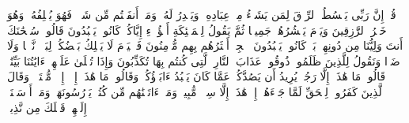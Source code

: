 \startbuffer[\q:34:39]
قُلۡ إِنَّ رَبِّی یَبۡسُطُ ٱلرِّزۡقَ لِمَن یَشَاۤءُ مِنۡ عِبَادِهِۦ وَیَقۡدِرُ لَهُۥۚ وَمَاۤ أَنفَقۡتُم مِّن شَیۡءࣲ فَهُوَ یُخۡلِفُهُۥۖ وَهُوَ خَیۡرُ ٱلرَّٰزِقِینَ%
\stopbuffer
\startbuffer[\q:34:40]
وَیَوۡمَ یَحۡشُرُهُمۡ جَمِیعࣰا ثُمَّ یَقُولُ لِلۡمَلَٰۤئِكَةِ أَهَٰۤؤُلَاۤءِ إِیَّاكُمۡ كَانُوا۟ یَعۡبُدُونَ%
\stopbuffer
\startbuffer[\q:34:41]
قَالُوا۟ سُبۡحَٰنَكَ أَنتَ وَلِیُّنَا مِن دُونِهِمۖ بَلۡ كَانُوا۟ یَعۡبُدُونَ ٱلۡجِنَّۖ أَكۡثَرُهُم بِهِم مُّؤۡمِنُونَ%
\stopbuffer
\startbuffer[\q:34:42]
فَٱلۡیَوۡمَ لَا یَمۡلِكُ بَعۡضُكُمۡ لِبَعۡضࣲ نَّفۡعࣰا وَلَا ضَرࣰّا وَنَقُولُ لِلَّذِینَ ظَلَمُوا۟ ذُوقُوا۟ عَذَابَ ٱلنَّارِ ٱلَّتِی كُنتُم بِهَا تُكَذِّبُونَ%
\stopbuffer
\startbuffer[\q:34:43]
وَإِذَا تُتۡلَىٰ عَلَیۡهِمۡ ءَایَٰتُنَا بَیِّنَٰتࣲ قَالُوا۟ مَا هَٰذَاۤ إِلَّا رَجُلࣱ یُرِیدُ أَن یَصُدَّكُمۡ عَمَّا كَانَ یَعۡبُدُ ءَابَاۤؤُكُمۡ وَقَالُوا۟ مَا هَٰذَاۤ إِلَّاۤ إِفۡكࣱ مُّفۡتَرࣰىۚ وَقَالَ ٱلَّذِینَ كَفَرُوا۟ لِلۡحَقِّ لَمَّا جَاۤءَهُمۡ إِنۡ هَٰذَاۤ إِلَّا سِحۡرࣱ مُّبِینࣱ%
\stopbuffer
\startbuffer[\q:34:44]
وَمَاۤ ءَاتَیۡنَٰهُم مِّن كُتُبࣲ یَدۡرُسُونَهَاۖ وَمَاۤ أَرۡسَلۡنَاۤ إِلَیۡهِمۡ قَبۡلَكَ مِن نَّذِیرࣲ%
\stopbuffer
